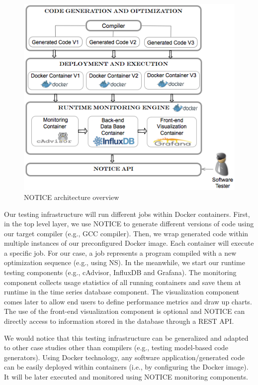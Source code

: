 \begin{figure}[h]
\centering
	\includegraphics[width=1.\linewidth]{Ressources/genecoApproach.png}
	\caption{NOTICE architecture overview}
\end{figure}


Our testing infrastructure will run different jobs within Docker containers. First, in the top level layer, we use NOTICE to generate different versions of code using our target compiler (e.g., GCC compiler). Then, we wrap generated code within multiple instances of our preconfigured Docker image. Each container will execute a specific job. For our case, a job represents a program compiled with a new optimization sequence (e.g., using NS). In the meanwhile, we start our runtime testing components (e.g., cAdvisor, InfluxDB and Grafana). The monitoring component collects usage statistics of all running containers and save them at runtime in the time series database component. The visualization component comes later to allow end users to define performance metrics and draw up charts. The use of the front-end visualization component is optional and NOTICE can directly access to information stored in the database through a REST API.  
\begin{remark}
We would notice that this testing infrastructure can be generalized and adapted to other case studies other than compilers (e.g., testing model-based code generators). Using Docker technology, any software application/generated code can be easily deployed within containers (i.e., by configuring the Docker image). It will be later executed and monitored using NOTICE monitoring components. 
\end{remark}

